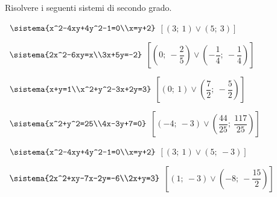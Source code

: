 \begin{esercizio}[\Ast]
 \label{ese:6.1}
Risolvere i seguenti sistemi di secondo grado.
 \begin{enumeratea}
 \item~\(\sistema{x^2-4xy+4y^2-1=0\\x=y+2}\)
\hfill\(\left[\left(3;~1\right)\vee \left(5;~3\right)\right]\)
 \item~\(\sistema{2x^2-6xy=x\\3x+5y=-2}\)
\hfill\(\left[\left(0;~-\dfrac 2 5\right)\vee 
       \left(-\dfrac 1 4;~-\dfrac 1 4\right)\right]\)
 \item~\(\sistema{x+y=1\\x^2+y^2-3x+2y=3}\)
\hfill\(\left[\left(0;~1\right)\vee \left(\dfrac 7 2;~-\dfrac 5 
2\right)\right]\)
 \item~\(\sistema{x^2+y^2=25\\4x-3y+7=0}\)
\hfill\(\left[\left(-4;~-3\right) \vee 
       \left(\dfrac{44}{25};~\dfrac{117}{25}\right)\right]\)
 \item~\(\sistema{x^2-4xy+4y^2-1=0\\x=y+2}\)
\hfill\(\left[\left(3;~1\right)\vee \left(5;~-3\right)\right]\)
 \item~\(\sistema{2x^2+xy-7x-2y=-6\\2x+y=3}\)
\hfill\(\left[\left(1;~-3\right)\vee \left(-8;~-\dfrac{15} 2\right)\right]\)
 \end{enumeratea}
\end{esercizio}

